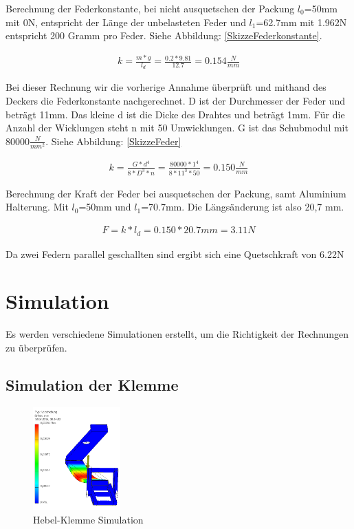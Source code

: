 Berechnung der Federkonstante, bei nicht ausquetschen der Packung $l_0$=50mm mit 0N, entspricht der Länge der unbelasteten Feder und $l_1$=62.7mm mit 1.962N entspricht 200 Gramm pro Feder. Siehe Abbildung: \ref{SkizzeFederkonstante}.

\begin{align*}
k =\frac{m*g}{l_d} = \frac{0.2*9.81}{12.7} = 0.154\frac{N}{mm}
\end{align*}

Bei dieser Rechnung wir die vorherige Annahme überprüft und mithand des Deckers die Federkonstante nachgerechnet. D ist der Durchmesser der Feder und beträgt 11mm. Das kleine d ist die Dicke des Drahtes und beträgt 1mm. Für die Anzahl der Wicklungen steht n mit 50 Umwicklungen. G ist das Schubmodul mit 80000$\frac{N}{mm^{2}}$. Siehe Abbildung: \ref{SkizzeFeder}

\begin{align*}
k=\frac{G*d^{4}}{8*D^{3}*n}=\frac{80000*1^{4}}{8*11^{3}*50} = 0.150\frac{N}{mm}
\end{align*}

Berechnung der Kraft der Feder bei ausquetschen der Packung, samt Aluminium Halterung. Mit $l_0$=50mm und $l_1$=70.7mm. Die Längsänderung ist also 20,7 mm.

\begin{align*}
F=k*l_d=0.150*20.7mm = 3.11N
\end{align*}

Da zwei Federn parallel geschallten sind ergibt sich eine Quetschkraft von 6.22N

\section{Simulation}
Es werden verschiedene Simulationen erstellt, um die Richtigkeit der Rechnungen zu überprüfen.

\subsection{Simulation der Klemme}

\begin{figure}
\vspace{-60pt}
  \begin{center}
    \includegraphics[width=0.3\textwidth]{Bilder/Simulation/Hebel}
  \end{center}
  \caption{Hebel-Klemme Simulation}
  \label{Hebel-Klemme_Simulation}
\end{figure}

